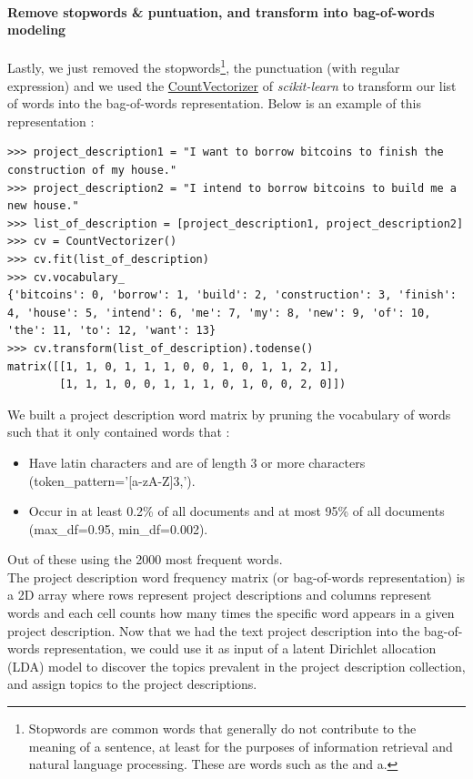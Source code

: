 		\paragraph{Remove stopwords \& puntuation, and transform into bag-of-words modeling}
			Lastly, we just removed the stopwords\footnote{Stopwords are common words that generally do not contribute to the meaning of a sentence, at least for the purposes of information retrieval and natural language processing. These are words such as the and a.}, the punctuation (with regular expression) and we used the \href{http://scikit-learn.org/stable/modules/generated/sklearn.feature_extraction.text.CountVectorizer.html}{CountVectorizer} of \textit{scikit-learn} to transform our list of words into the bag-of-words representation. Below is an example of this representation :
			\begin{verbatim}
>>> project_description1 = "I want to borrow bitcoins to finish the construction of my house."
>>> project_description2 = "I intend to borrow bitcoins to build me a new house."
>>> list_of_description = [project_description1, project_description2]
>>> cv = CountVectorizer()
>>> cv.fit(list_of_description)
>>> cv.vocabulary_
{'bitcoins': 0, 'borrow': 1, 'build': 2, 'construction': 3, 'finish': 4, 'house': 5, 'intend': 6, 'me': 7, 'my': 8, 'new': 9, 'of': 10, 'the': 11, 'to': 12, 'want': 13}
>>> cv.transform(list_of_description).todense()
matrix([[1, 1, 0, 1, 1, 1, 0, 0, 1, 0, 1, 1, 2, 1],
        [1, 1, 1, 0, 0, 1, 1, 1, 0, 1, 0, 0, 2, 0]])
			\end{verbatim}
		We built a project description word matrix by pruning the vocabulary of words such that it only contained words that :
		\begin{itemize}
			\item Have latin characters and are of length 3 or more characters (token\_pattern='[a-zA-Z]{3,}').
			\item Occur in at least 0.2\% of all documents and at most 95\% of all documents (max\_df=0.95, min\_df=0.002).
		\end{itemize}
		Out of these using the 2000 most frequent words.\\

		The project description word frequency matrix (or bag-of-words representation) is a 2D array where rows represent project descriptions and columns represent words and each cell counts how many times the specific word appears in a given project description. Now that we had the text project description into the bag-of-words representation, we could use it as input of a latent Dirichlet allocation (LDA) model to discover the topics prevalent in the project description collection, and assign topics to the project descriptions.

